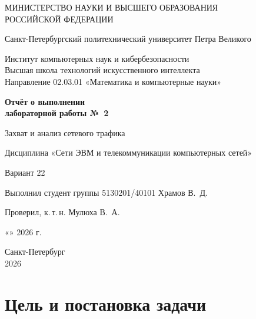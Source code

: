 \documentclass[a4paper,14pt]{extarticle}
\begin{document}
\begin{titlepage}
  \thispagestyle{empty}
  \begin{center}
    \begin{singlespace}
      МИНИСТЕРСТВО НАУКИ И ВЫСШЕГО ОБРАЗОВАНИЯ\\
      РОССИЙСКОЙ ФЕДЕРАЦИИ\par\medskip
      Санкт-Петербургский политехнический университет Петра Великого\par\medskip
      Институт компьютерных наук и кибербезопасности\\
      Высшая школа технологий искусственного интеллекта\\
      Направление 02.03.01 «Математика и компьютерные науки»
    \end{singlespace}

    \vfill
    {\Large\bfseries Отчёт о выполнении\\лабораторной работы №~2\par}
    \medskip
    {\large Захват и анализ сетевого трафика\par}
    \medskip
    Дисциплина «Сети ЭВМ и телекоммуникации компьютерных сетей»\par
    Вариант 22\par
  \end{center}

  \vfill
  \noindent Выполнил студент группы 5130201/40101\hfill
  \underline{\hspace{2.3cm}}\enspace Храмов В.~Д.\par\medskip
  \noindent Проверил, к.\,т.\,н.\hfill
  \underline{\hspace{2.3cm}}\enspace Мулюха В.~А.\par\medskip
  \begin{flushright}
    «\underline{\hspace{0.9cm}}» \underline{\hspace{2.6cm}} 2026 г.
  \end{flushright}

  \vfill
  \begin{center}
    Санкт-Петербург\\2026
  \end{center}
\end{titlepage}

\setcounter{page}{2}
\tableofcontents
\clearpage

\section{Цель и постановка задачи}
\end{document}
